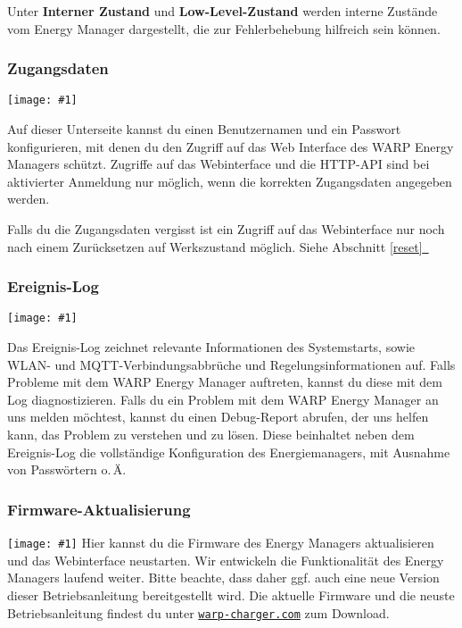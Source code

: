 \documentclass[a4paper,10pt]{article}
\newcommand{\hint}[1]{\begin{tcolorbox}[colback=boxgray,colframe=black,coltext=
white,title=Hinweis,left*=2mm,right*=2mm,boxsep=1mm,bottom=1mm,top=1mm]#1\end{tcolorbox}}
\newcommand{\gfx}[1]{\texttt{[image: \#1]}}
\newcommand*{\fullref}[1]{Abschnitt \hyperref[{#1}]{\ref*{#1}~\nameref*{#1}}}
\newcommand\rurl[2]{%
  \href{#1}{\nolinkurl{#2}}%
}
\begin{document}
\begin{multicols*}{2}
	Unter \textbf{Interner Zustand} und \textbf{Low-Level-Zustand} werden interne Zustände vom Energy Manager
	dargestellt, die zur Fehlerbehebung hilfreich sein können.

	\subsubsection{Zugangsdaten}

	\gfx{./img/resized/web_authentication.png}

	Auf dieser Unterseite kannst du einen Benutzernamen und ein Passwort konfigurieren, mit denen du den Zugriff auf das Web Interface
	des WARP Energy Managers schützt. Zugriffe auf das Webinterface und die HTTP-API sind bei aktivierter Anmeldung nur möglich, wenn
	die korrekten Zugangsdaten angegeben werden.
	\hint{Falls du die Zugangsdaten vergisst ist ein Zugriff auf das Webinterface nur noch nach einem Zurücksetzen auf Werkszustand möglich. Siehe \fullref{reset}}

	\subsubsection{Ereignis-Log}
	\gfx{./img/resized/web_event_log}

	Das Ereignis-Log zeichnet relevante Informationen des Systemstarts, sowie WLAN- und MQTT-Verbindungsabbrüche und Regelungsinformationen auf.
	Falls Probleme mit dem WARP Energy Manager auftreten, kannst du diese mit dem Log diagnostizieren.
	Falls du ein Problem mit dem WARP Energy Manager an uns melden möchtest, kannst du einen Debug-Report abrufen,
	der uns helfen kann, das Problem zu verstehen und zu lösen. Diese beinhaltet neben dem Ereignis-Log die vollständige
	Konfiguration des Energiemanagers, mit Ausnahme von Passwörtern o.\,Ä.

	\subsubsection{Firmware-Aktualisierung}
	\label{firmware-update}
	\gfx{./img/resized/web_firmware_update}
	Hier kannst du die Firmware des Energy Managers aktualisieren und das Webinterface neustarten.
	Wir entwickeln die Funktionalität
	des Energy Managers laufend weiter. Bitte beachte, dass daher ggf. auch eine neue
	Version dieser Betriebsanleitung bereitgestellt wird.
	Die aktuelle Firmware und die neuste Betriebsanleitung findest du unter
	\rurl{https://warp-charger.com}{warp-charger.com} zum Download.


\end{multicols*}
\end{document}
